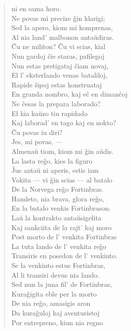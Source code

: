 \begin{verse}
ni en sama horo.\\
 Ne povas mi precize \^gin klarigi;\\ Sed la apero, kiom
mi komprenas,\\ Al nia land' malbonon anta\u udiras.\\
 \^Cu ne militon? \^Cu vi scias, kial\\ Nun gardoj \^cie
staras, pafilegoj\\ Nun estas pretigataj \^ciam novaj,\\ El l'
eksterlando venas bataliloj,\\ Rapide \^sipoj estas konstruataj\\ En
granda nombro, kaj e\^c en diman\^coj\\ Ne \^cesas la prepara
laborado?\\ El kia ka\u uzo tiu rapidado\\ Kaj laborad' en tago kaj
en nokto?\\ \^Cu povas iu diri?\\
 Jes, mi povas, ---\\ Almena\u u tiom, kiom mi \^gin a\u
udis.\\ La lasta reĝo, kies la figuro\\ \^Jus anta\u u ni aperis,
estis iam\\ Vokita --- vi \^gin scias --- al batalo\\ De la Norvega
reĝo Fortinbras.\\ Hamleto, nia brava, glora reĝo,\\ En la
batalo venkis Fortinbrason.\\ La\u u la kontrakto anta\u usigelita\\
Kaj sankciita de la rajt' kaj moro\\ Post morto de l' venkita
Fortinbras\\ La tuta lando de l' venkita reĝo\\ Transiris en
posedon de l' venkinto.\\ Se la venkinto estus Fortinbras,\\ Al li
transiri devus nia lando.\\ Sed nun la juna fil' de Fortinbras,\\
Kura\^gigita eble per la morto\\ De nia reĝo, amasigis aron\\ Da
kura\^guloj kaj aventuristoj\\ Por entrepreno, kiun nia regno\\

\end{verse}
